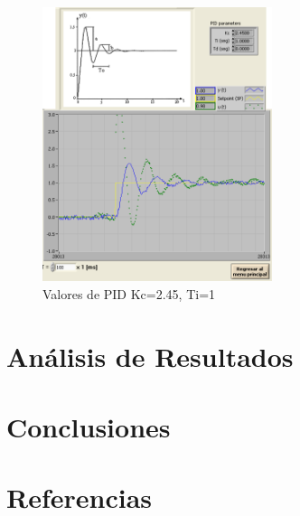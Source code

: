 \documentclass[]{article}
\begin{document}
\begin{figure}[h!]
	\centering
	\includegraphics[width=0.6\textwidth]{Imagenes/signalActividad6prueba3}
	\caption{Valores de PID Kc=2.45, Ti=1}
	\label{fig:signalActividad6prueba3}
\end{figure}





\section{Análisis de Resultados}



\section{Conclusiones}


\section{Referencias}



\end{document}
